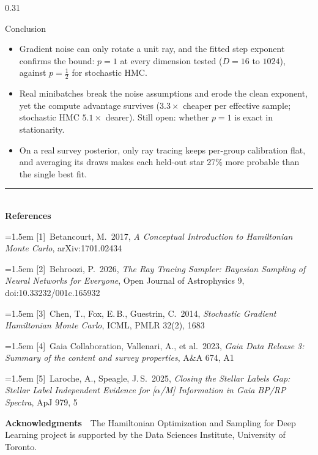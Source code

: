 \documentclass[final]{beamer}
\newcommand{\refitem}[2]{\noindent\hangindent=1.5em\hangafter=1 [#1]~#2\par}
\begin{document}
\begin{frame}[t]
\begin{columns}[t]
\begin{column}{0.31\paperwidth}
\begin{block}{Conclusion}
\begin{itemize}\setlength{\itemsep}{0.02cm}
  \item Gradient noise can only rotate a unit ray, and the fitted step
    exponent confirms the bound: \(p=1\) at every dimension tested
    (\(D=16\) to \(1024\)), against \(p=\tfrac12\) for stochastic HMC.
  \item Real minibatches break the noise assumptions and erode the clean
    exponent, yet the compute advantage survives (\(3.3\times\) cheaper per
    effective sample; stochastic HMC \(5.1\times\) dearer). Still open:
    whether \(p=1\) is exact in stationarity.
  \item On a real survey posterior, only ray tracing keeps per-group
    calibration flat, and averaging its draws makes each held-out star
    27\% more probable than the single best fit.
\end{itemize}
\end{block}

{\footnotesize\setlength{\parskip}{0.20\baselineskip}
\noindent\textcolor{uoftblue}{\rule{\linewidth}{0.7mm}}\\[0.35ex]
\textbf{References}\par
\refitem{1}{Betancourt, M.\ 2017, \emph{A Conceptual Introduction to Hamiltonian Monte Carlo}, arXiv:1701.02434}
\refitem{2}{Behroozi, P.\ 2026, \emph{The Ray Tracing Sampler: Bayesian Sampling of Neural Networks for Everyone}, Open Journal of Astrophysics 9, doi:10.33232/001c.165932}
\refitem{3}{Chen, T., Fox, E.\,B., Guestrin, C.\ 2014, \emph{Stochastic Gradient Hamiltonian Monte Carlo}, ICML, PMLR 32(2), 1683}
\refitem{4}{Gaia Collaboration, Vallenari, A., et al.\ 2023, \emph{Gaia Data Release 3: Summary of the content and survey properties}, A\&A 674, A1}
\refitem{5}{Laroche, A., Speagle, J.\,S.\ 2025, \emph{Closing the Stellar Labels Gap: Stellar Label Independent Evidence for [\(\alpha\)/M] Information in Gaia BP/RP Spectra}, ApJ 979, 5}
\vspace{0.30cm}

\noindent\textbf{Acknowledgments}\ \ The Hamiltonian Optimization and Sampling
for Deep Learning project is supported by the Data Sciences Institute,
University of Toronto.
}

\end{column}

\end{columns}

\end{frame}
\end{document}
